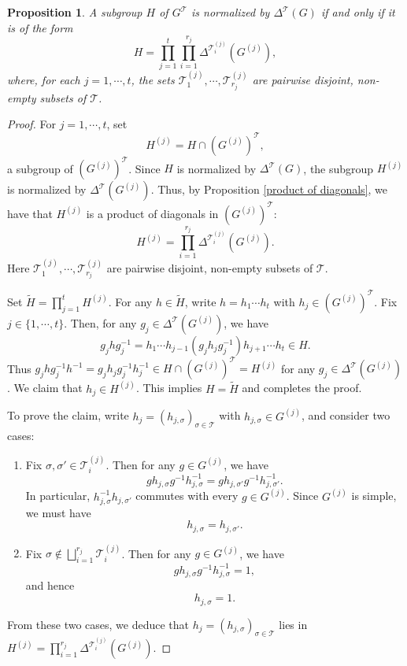 \documentclass[11pt,oneside,reqno]{amsart}
\newcommand{\Tcal}{\mathcal{T}}
\theoremstyle{plain}
\newtheorem{proposition}[theorem]{Proposition}
\begin{document}
	
	
	
	
	\begin{proposition}\label{H is a product of diagonals}
		A subgroup $H$ of $G^\Tcal$ is normalized by $\Delta^\Tcal(G)$ if and only if it is of the form
		\[
		H=\prod_{j=1}^t\prod_{i=1}^{r_j}\Delta^{\Tcal_i^{(j)}}(G^{(j)}),
		\]
		where, for each $j=1,\cdots,t$, the sets $\Tcal_1^{(j)},\cdots,\Tcal_{r_j}^{(j)}$ are pairwise disjoint, non-empty subsets of $\Tcal$.
	\end{proposition}
	\begin{proof}
		For $j=1,\cdots,t$, set
		\[
		H^{(j)}=H\cap (G^{(j)})^\Tcal,
		\]
		a subgroup of $(G^{(j)})^\Tcal$.
		Since $H$ is normalized by $\Delta^\Tcal(G)$, the subgroup $H^{(j)}$ is normalized by $\Delta^\Tcal(G^{(j)})$.
		Thus, by Proposition \ref{product of diagonals}, we have that $H^{(j)}$ is a product of diagonals in $(G^{(j)})^\Tcal$:
		\[
		H^{(j)}=\prod_{i=1}^{r_j}\Delta^{\Tcal_i^{(j)}}(G^{(j)}).
		\]
		Here $\Tcal_1^{(j)},\cdots,\Tcal_{r_j}^{(j)}$ are pairwise disjoint, non-empty subsets of $\Tcal$.
		
		Set $\widetilde{H}=\prod_{j=1}^t H^{(j)}$. For any $h\in\widetilde{H}$, write $h=h_1\cdots h_t$ with $h_j\in (G^{(j)})^\Tcal$.
		Fix $j\in\{1,\cdots,t\}$. Then, for any $g_j\in\Delta^\Tcal(G^{(j)})$, we have
		\[
		g_jhg_j^{-1}
		=
		h_1\cdots h_{j-1}(g_jh_jg_j^{-1})h_{j+1}\cdots h_t\in H.
		\]
		Thus $g_jhg_j^{-1}h^{-1}=g_jh_jg_j^{-1}h_j^{-1}\in H\cap (G^{(j)})^\Tcal=H^{(j)}$ for any $g_j\in\Delta^\Tcal(G^{(j)})$.
		We claim that $h_j\in H^{(j)}$. This implies $H=\widetilde{H}$ and completes the proof.
		
		To prove the claim, write $h_j=(h_{j,\sigma})_{\sigma\in\Tcal}$ with $h_{j,\sigma}\in G^{(j)}$, and consider two cases:
		\begin{enumerate}
			\item 
			Fix $\sigma,\sigma'\in\Tcal_i^{(j)}$. Then for any $g\in G^{(j)}$, we have
			\[
			gh_{j,\sigma}g^{-1}h_{j,\sigma}^{-1}
			=
			gh_{j,\sigma'}g^{-1}h_{j,\sigma'}^{-1}.
			\]
			In particular, $h_{j,\sigma}^{-1}h_{j,\sigma'}$ commutes with every $g\in G^{(j)}$. Since $G^{(j)}$ is simple, we must have
			\[
			h_{j,\sigma}=h_{j,\sigma'}.
			\]
			
			
			\item 
			Fix $\sigma\notin\bigsqcup_{i=1}^{r_j}\Tcal_i^{(j)}$. Then for any $g\in G^{(j)}$, we have
			\[
			gh_{j,\sigma}g^{-1}h_{j,\sigma}^{-1}=1,
			\]
			and hence
			\[
			h_{j,\sigma}=1.
			\]
		\end{enumerate}
		From these two cases, we deduce that $h_j=(h_{j,\sigma})_{\sigma\in\Tcal}$ lies in $H^{(j)}=\prod_{i=1}^{r_j}\Delta^{\Tcal_i^{(j)}}(G^{(j)})$.
	\end{proof}
	
\end{document}
